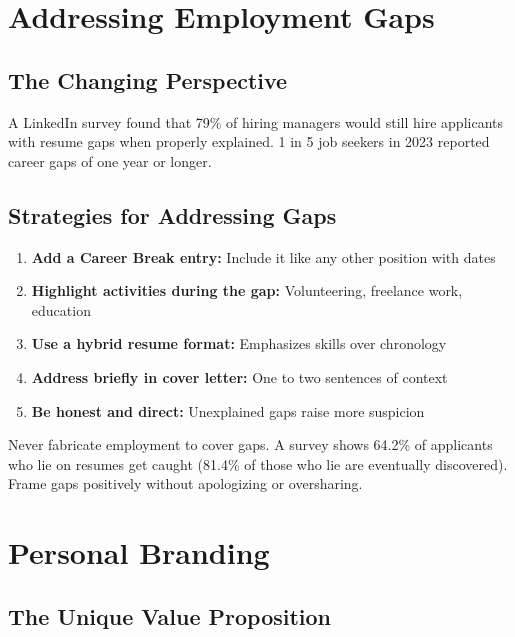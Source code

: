 \documentclass[11pt,a4paper]{article}
\begin{document}
\section{Addressing Employment Gaps}

\subsection{The Changing Perspective}

\begin{keystat}
A LinkedIn survey found that 79\% of hiring managers would still hire applicants with resume gaps when properly explained. 1 in 5 job seekers in 2023 reported career gaps of one year or longer.
\end{keystat}

\subsection{Strategies for Addressing Gaps}

\begin{enumerate}
    \item \textbf{Add a Career Break entry:} Include it like any other position with dates
    \item \textbf{Highlight activities during the gap:} Volunteering, freelance work, education
    \item \textbf{Use a hybrid resume format:} Emphasizes skills over chronology
    \item \textbf{Address briefly in cover letter:} One to two sentences of context
    \item \textbf{Be honest and direct:} Unexplained gaps raise more suspicion
\end{enumerate}

\begin{warning}
Never fabricate employment to cover gaps. A survey shows 64.2\% of applicants who lie on resumes get caught (81.4\% of those who lie are eventually discovered). Frame gaps positively without apologizing or oversharing.
\end{warning}

\section{Personal Branding}

\subsection{The Unique Value Proposition}
\end{document}
